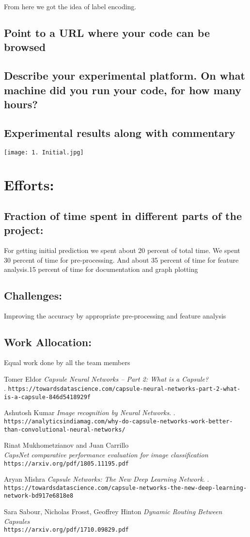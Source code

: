 \documentclass[12pt, a4paper]{article}
\begin{document}
From here we got the idea of label encoding.
\subsection{\textbf{Point to a URL where your code can be browsed}}
\subsection{\textbf{Describe your experimental platform.  On what machine did you run your code, for how many hours?}}
\subsection{\textbf{Experimental results along with commentary}}
\texttt{[image: 1. Initial.jpg]}
\section{Efforts:}
\subsection{Fraction of time spent in different parts of the project:}
For getting initial prediction we spent about 20 percent of total time. We spent 30 percent of time for pre-processing. And about 35 percent of time for feature  analysis.15 percent of time for documentation and graph plotting
\subsection{Challenges:}
Improving the accuracy by appropriate pre-processing and feature analysis
\subsection{Work Allocation:}
Equal work done by all the team members
\medskip
 
\begin{thebibliography}{}
Tomer Eldor
\textit{Capsule Neural Networks – Part 2: What is a Capsule?}\\. 
\texttt{https://towardsdatascience.com/capsule-neural-networks-part-2-what-is-a-capsule-846d5418929f}
 
Ashutosh Kumar 
\textit{Image recognition by Neural Networks}. . 
\texttt{https://analyticsindiamag.com/why-do-capsule-networks-work-better-than-convolutional-neural-networks/}
 
Rinat Mukhometzianov and Juan Carrillo
\\\textit{CapsNet comparative performance evaluation for image classification}
\texttt{https://arxiv.org/pdf/1805.11195.pdf}

Aryan Mishra 
\textit{Capsule Networks: The New Deep Learning Network}. . 
\texttt{https://towardsdatascience.com/capsule-networks-the-new-deep-learning-network-bd917e6818e8}

Sara Sabour, Nicholas Frosst, Geoffrey Hinton
\textit{Dynamic Routing Between Capsules}
\\\texttt{https://arxiv.org/pdf/1710.09829.pdf}



\end{thebibliography}
 
\end{document}
